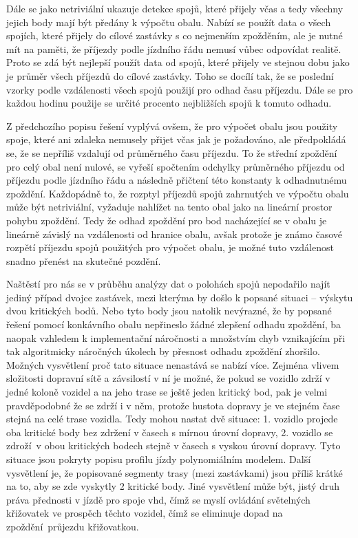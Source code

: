  \bigbreak

Dále se jako netriviální ukazuje detekce spojů, které přijely včas a tedy všechny jejich body mají být předány k výpočtu obalu. Nabízí se použít data o všech spojích, které přijely do cílové zastávky s co nejmenším zpožděním, ale je nutné mít na paměti, že příjezdy podle jízdního řádu nemusí vůbec odpovídat realitě. Proto se zdá být nejlepší použít data od spojů, které přijely ve stejnou dobu jako je průměr všech příjezdů do cílové zastávky. Toho se docílí tak, že se poslední vzorky podle vzdálenosti všech spojů použijí pro odhad času příjezdu. Dále se pro každou hodinu použije se určité procento nejbližších spojů k tomuto odhadu.

\bigbreak

Z předchozího popisu řešení vyplývá ovšem, že pro výpočet obalu jsou použity spoje, které ani zdaleka nemusely přijet včas jak je požadováno, ale předpokládá se, že se nepříliš vzdalují od průměrného času příjezdu. To že střední zpoždění pro celý obal není nulové, se vyřeší spočtením odchylky průměrného příjezdu od příjezdu podle jízdního řádu a následně přičtení této konstanty k odhadnutnému zpoždění. Každopádně to, že rozptyl příjezdů spojů zahrnutých ve výpočtu obalu může být netriviální, vyžaduje nahlížet na tento obal jako na lineární prostor pohybu zpoždění. Tedy že odhad zpoždění pro bod nacházející se v obalu je lineárně závislý na vzdálenosti od hranice obalu, avšak protože je známo časové rozpětí příjezdu spojů použitých pro výpočet obalu, je možné tuto vzdálenost snadno přenést na skutečné pozdění.

\bigbreak

Naštěstí pro nás se v průběhu analýzy dat o polohách spojů nepodařilo najít jediný případ dvojce zastávek, mezi kterýma by došlo k popsané situaci -- výskytu dvou kritických bodů. Nebo tyto body jsou natolik nevýrazné, že by popsané řešení pomocí konkávního obalu nepřineslo žádné zlepšení odhadu zpoždění, ba naopak vzhledem k implementační náročnosti a množstvím chyb vznikajícím při tak algoritmicky náročných úkolech by přesnost odhadu zpoždění zhoršilo. Možných vysvětlení proč tato situace nenastává se nabízí více. Zejména vlivem složitosti dopravní sítě a závsilostí v ní je možné, že pokud se vozidlo zdrží v jedné koloně vozidel a na jeho trase se ještě jeden kritický bod, pak je velmi pravděpodobné že se zdrží i v něm, protože hustota dopravy je ve stejném čase stejná na celé trase vozidla. Tedy mohou nastat dvě situace: 1. vozidlo projede oba kritické body bez zdržení v časech s mírnou úrovní dopravy, 2. vozidlo se zdroží v obou kritických bodech stejně v časech s vyskou úrovní dopravy. Tyto situace jsou pokryty popisu profilu jízdy polynomiálním modelem. Další vysvětlení je, že popisované segmenty trasy (mezi zastávkami) jsou příliš krátké na to, aby se zde vyskytly 2 kritické body. Jiné vysvětlení může být, jistý druh práva přednosti v jízdě pro spoje \gls{vhd}, čímž se myslí ovládání světelných křižovatek ve prospěch těchto vozidel, čímž se eliminuje dopad na zpoždění průjezdu křižovatkou.

